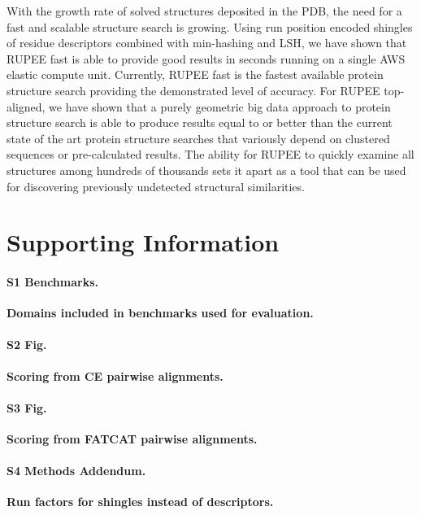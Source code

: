 \documentclass[10pt,letterpaper]{article}
\begin{document}
With the growth rate of solved structures deposited in the PDB, the need for a fast and scalable structure search is growing. 
Using run position encoded shingles of residue descriptors combined with min-hashing and LSH, we have shown that RUPEE fast is able to provide good results in seconds running on a single AWS elastic compute unit.
Currently, RUPEE fast is the fastest available protein structure search providing the demonstrated level of accuracy. 
For RUPEE top-aligned, we have shown that a purely geometric big data approach to protein structure search is able to produce results equal to or better than the current state of the art protein structure searches that variously depend on clustered sequences or pre-calculated results. 
The ability for RUPEE to quickly examine all structures among hundreds of thousands sets it apart as a tool that can be used for discovering previously undetected structural similarities.

\section*{Supporting Information}

\paragraph*{S1 Benchmarks.}
\label{S1_Benchmarks}
{\bf Domains included in benchmarks used for evaluation.} 

\paragraph*{S2 Fig.}
\label{S2_Fig}
{\bf Scoring from CE pairwise alignments.} 

\paragraph*{S3 Fig.}
\label{S3_Fig}
{\bf Scoring from FATCAT pairwise alignments.} 

\paragraph*{S4 Methods Addendum.}
\label{S4_Methods}
{\bf Run factors for shingles instead of descriptors.} 


\nolinenumbers

%
%
% 

\nocite{Ayoub2017}
\nocite{BioJava2012}

\end{document}
